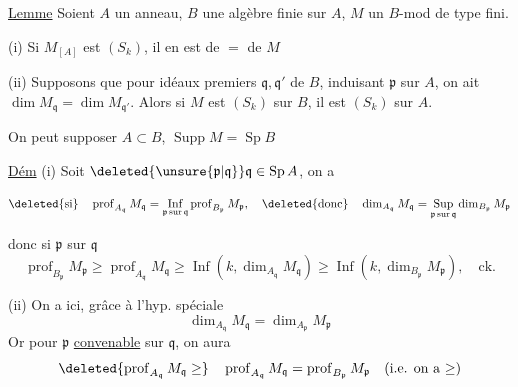  \uline{Lemme} Soient $A$ un anneau, $B$ une algèbre finie sur $A$, $M$ un $B$-mod de type fini.

(i) Si $M_{[A]}$ est $(S_k)$, il en est de $=$ de $M$

(ii) Supposons que pour  idéaux premiers $\mathfrak q,\mathfrak q'$ de $B$, induisant  $\mathfrak p$ sur $A$, on ait $\dim M_{\mathfrak q}=\dim M_{\mathfrak q'}$. Alors si $M$ est $(S_k)$ sur $B$, il est $(S_k)$ sur $A$.

On peut supposer $A\subset B$,  $\operatorname{Supp} M=\operatorname{Sp} B$

\uline{Dém} (i) Soit $\deleted{\unsure{\mathfrak p|\mathfrak q}}\mathfrak q\in\operatorname{Sp} A$,  on a

\[
\deleted{\text{si}}\quad \operatorname{prof}_{A_{\mathfrak q}} M_{\mathfrak q}=\mathop{\mathrm{Inf}}_{\mathfrak p\,\mathrm{sur}\,\mathfrak q}\operatorname{prof}_{B_{\mathfrak p}}M_{\mathfrak p},\quad
\deleted{\text{donc}}\quad \dim_{A_{\mathfrak q}}M_{\mathfrak q}=\mathop{\mathrm{Sup}}_{\mathfrak p\,\mathrm{sur}\,\mathfrak q}\dim_{B_{\mathfrak p}}M_{\mathfrak p}
\]

donc si $\mathfrak p$ sur $\mathfrak q$
\[
\operatorname{prof}_{B_{\mathfrak p}}M_{\mathfrak p}\geq\operatorname{prof}_{A_{\mathfrak q}}M_{\mathfrak q}\geq\operatorname{Inf}(k,\dim_{A_{\mathfrak q}}M_{\mathfrak q})\geq\operatorname{Inf}(k,\dim_{B_{\mathfrak p}}M_{\mathfrak p}),\quad\text{ck.}
\]

(ii) On a ici, grâce à l'hyp. spéciale
\[
\dim_{A_{\mathfrak q}}M_{\mathfrak q}=\dim_{A_{\mathfrak p}}M_{\mathfrak p}
\]
Or pour $\mathfrak p$ \uline{convenable} sur $\mathfrak q$, on aura 
\[
\deleted{\operatorname{prof}_{A_{\mathfrak q}}M_{\mathfrak q}\geq}\quad \operatorname{prof}_{A_{\mathfrak q}}M_{\mathfrak q}=\operatorname{prof}_{B_{\mathfrak p}}M_{\mathfrak p}\quad(\text{i.e. on a }{\geq})
\]

